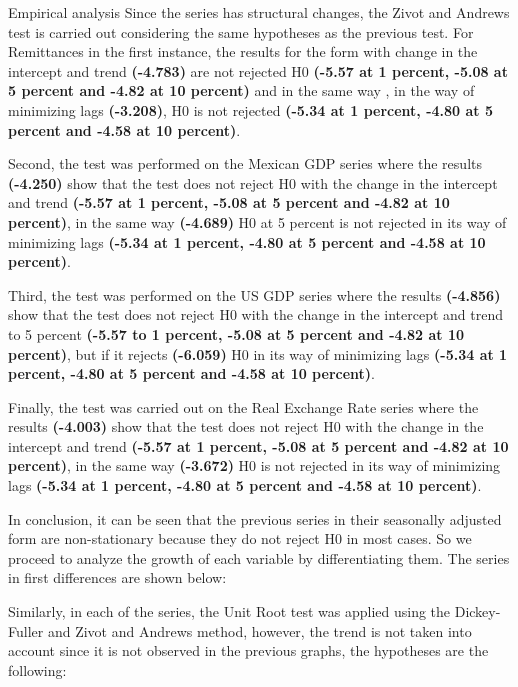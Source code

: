 \begin{frame}{Empirical analysis}
Since the series has structural changes, the Zivot and Andrews test is carried out considering the same hypotheses as the previous test. For Remittances in the first instance, the results for the form with change in the intercept and trend \textbf{(-4.783)} are not rejected H0 \textbf{(-5.57 at 1 percent, -5.08 at 5 percent and -4.82 at 10 percent)} and in the same way , in the way of minimizing lags \textbf{(-3.208)}, H0 is not rejected \textbf{(-5.34 at 1 percent, -4.80 at 5 percent and -4.58 at 10 percent)}.\par
Second, the test was performed on the Mexican GDP series where the results \textbf{(-4.250)} show that the test does not reject H0 with the change in the intercept and trend \textbf{(-5.57 at 1 percent, -5.08 at 5 percent and -4.82 at 10 percent)}, in the same way \textbf{(-4.689)} H0 at 5 percent is not rejected in its way of minimizing lags \textbf{(-5.34 at 1 percent, -4.80 at 5 percent and -4.58 at 10 percent)}.\par
Third, the test was performed on the US GDP series where the results \textbf{(-4.856)} show that the test does not reject H0 with the change in the intercept and trend to 5 percent \textbf{(-5.57 to 1 percent, -5.08 at 5 percent and -4.82 at 10 percent)}, but if it rejects \textbf{(-6.059)} H0 in its way of minimizing lags \textbf{(-5.34 at 1 percent, -4.80 at 5 percent and -4.58 at 10 percent)}.\par
Finally, the test was carried out on the Real Exchange Rate series where the results \textbf{(-4.003)} show that the test does not reject H0 with the change in the intercept and trend \textbf{(-5.57 at 1 percent, -5.08 at 5 percent and -4.82 at 10 percent)}, in the same way \textbf{(-3.672)} H0 is not rejected in its way of minimizing lags \textbf{(-5.34 at 1 percent, -4.80 at 5 percent and -4.58 at 10 percent)}.\par
In conclusion, it can be seen that the previous series in their seasonally adjusted form are non-stationary because they do not reject H0 in most cases. So we proceed to analyze the growth of each variable by differentiating them. The series in first differences are shown below:\par
Similarly, in each of the series, the Unit Root test was applied using the Dickey-Fuller and Zivot and Andrews method, however, the trend is not taken into account since it is not observed in the previous graphs, the hypotheses are the following:\par
\begin{center}

\end{center}
\end{frame}
